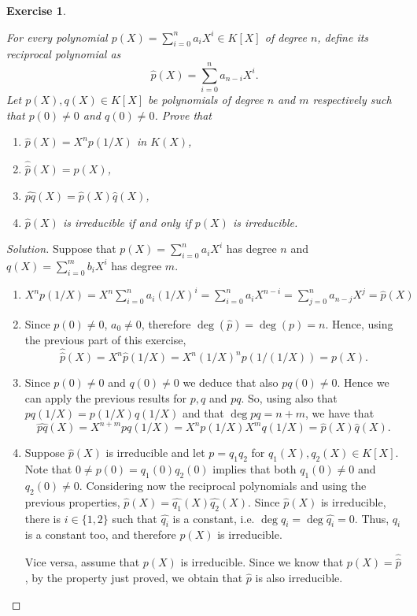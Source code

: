 \documentclass[a4paper,10pt,reqno]{amsart}
\newtheorem{ex}{Exercise}[section]
\newenvironment{sol}
  {\renewcommand\qedsymbol{$\blacksquare$}\begin{proof}[Solution]}
  {\end{proof}}
\begin{document}
\begin{ex}
\label{3.1}
    
    For every polynomial $p(X)=\sum_{i=0}^n a_iX^i\in K[X]$ of degree $n$,
    define its \emph{reciprocal polynomial} as
    \[
    \widehat{p}(X)=\sum_{i=0}^n a_{n-i}X^i.
    \]
    Let $p(X),q(X)\in K[X]$ be polynomials of degree $n$ and $m$ respectively such that $p(0)\neq 0$ and $q(0)\neq 0$. Prove that
    \begin{enumerate}[label=(\roman*)]
    \item $\widehat{p}(X)=X^np(1/X)$ in $K(X)$,
    \item $\widehat{ \widehat{p}}(X)=p(X)$,
    \item $\widehat{pq}(X)=\widehat{p}(X)\widehat{q}(X)$,
    \item $\widehat{p}(X)$ is irreducible if and only if $p(X)$ is irreducible.
    \end{enumerate}
\end{ex}

\begin{sol}
Suppose that $p(X)=\sum_{i=0}^n a_iX^i$ has degree $n$ and $q(X)=\sum_{i=0}^m b_iX^i$ has degree $m$.
    \begin{enumerate}[label=(\roman*)]
    \item 
    $X^np(1/X)=X^n\sum_{i=0}^n a_i(1/X)^i=\sum_{i=0}^n a_iX^{n-i}=\sum_{j=0}^n a_{n-j}X^j=\widehat{p}(X)$
    \item Since $p(0)\neq 0$, $a_0\neq 0$, therefore $\deg(\widehat{p})=\deg(p)=n$. Hence, using the previous part of this exercise,
    \[
    \widehat{\widehat{p}}(X)=X^n\widehat{p}(1/X)=X^n(1/X)^np(1/(1/X))=p(X).
    \]    
    \item Since $p(0)\neq 0$ and $q(0)\neq 0$ we deduce that also $pq(0)\neq 0$.
    Hence we can apply the previous results for $p,q$ and $pq$. 
    So, using also that $pq(1/X)=p(1/X)q(1/X)$ and that $\deg{pq}=n+m$, we have that
    \[
    \widehat{pq}(X)=X^{n+m}pq(1/X)=X^np(1/X)X^mq(1/X)=\widehat{p}(X)\widehat{q}(X).
    \]
    \item Suppose $\widehat{p}(X)$ is irreducible and let $p=q_1q_2$ for
    $q_1(X),q_2(X)\in K[X]$.
    Note that $0\neq p(0)=q_1(0)q_2(0)$ implies that both $q_1(0)\neq 0$ and $q_2(0)\neq 0$.
    Considering now the reciprocal polynomials and using the previous properties,
    $\widehat{p}(X)=\widehat{q_1}(X)\widehat{q_2}(X)$.
    Since $\widehat{p}(X)$ is irreducible, there is $i\in\{1,2\}$ such that $\widehat{q_i}$ 
    is a constant, i.e. $\deg{q_i}=\deg{\widehat{q_i}}=0$.
    Thus, $q_i$ is a constant too, and therefore $p(X)$ is irreducible.

    Vice versa, assume that $p(X)$ is irreducible. Since we know that $p(X)=\widehat{\widehat{p}}$, by the property just proved, we obtain that $\widehat{p}$ 
    is also irreducible.\qedhere
    \end{enumerate}
\end{sol}
\end{document}

